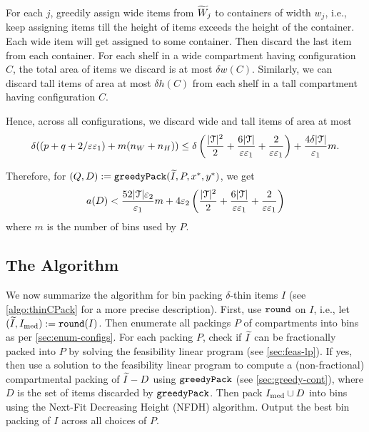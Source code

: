 For each $j$, greedily assign wide items from $\widetilde{W}_j$ to containers of width $w_j$,
i.e., keep assigning items till the height of items exceeds the height of the container.
Each wide item will get assigned to some container.
Then discard the last item from each container.
For each shelf in a wide compartment having configuration $C$,
the total area of items we discard is at most $\delta w(C)$.
Similarly, we can discard tall items of area at most $\delta h(C)$
from each shelf in a tall compartment having configuration $C$.

Hence, across all configurations, we discard wide and tall items of area at most
\[ \delta((p + q + 2/\varepsilon\varepsilon_1) + m(n_W + n_H))
\le \delta\left(\frac{|\mathcal{T}|^2}{2} + \frac{6|\mathcal{T}|}{\varepsilon\varepsilon_1}
    + \frac{2}{\varepsilon\varepsilon_1}\right) + \frac{4\delta|\mathcal{T}|}{\varepsilon_1}m. \]

Therefore, for $(Q, D) := \operatorname{\mathtt{greedyPack}}(\widetilde{I}, P, x^*, y^*)$, we get
\begin{equation}
\label{eqn:greedy-discard-area}
a(D) < \frac{52|\mathcal{T}|\varepsilon_2}{\varepsilon_1} m
    + 4\varepsilon_2\left(\frac{|\mathcal{T}|^2}{2} + \frac{6|\mathcal{T}|}{\varepsilon\varepsilon_1}
        + \frac{2}{\varepsilon\varepsilon_1}\right)
\end{equation}
where $m$ is the number of bins used by $P$.

\subsection{The Algorithm}
\label{sec:thinCPack}

We now summarize the algorithm for bin packing $\delta$-thin items $I$
(see \cref{algo:thinCPack} for a more precise description).
First, use $\operatorname{\mathtt{round}}$ on $I$, i.e., let $(\widetilde{I}, I_{\mathrm{med}}) := \operatorname{\mathtt{round}}(I)$.
Then enumerate all packings $P$ of compartments into bins as per \cref{sec:enum-configs}.
For each packing $P$, check if $\widetilde{I}$ can be fractionally packed into $P$
by solving the feasibility linear program (see \cref{sec:feas-lp}).
If yes, then use a solution to the feasibility linear program to
compute a (non-fractional) compartmental packing of $\widetilde{I} - D$
using $\operatorname{\mathtt{greedyPack}}$ (see \cref{sec:greedy-cont}),
where $D$ is the set of items discarded by $\operatorname{\mathtt{greedyPack}}$.
Then pack $I_{\mathrm{med}} \cup D$ into bins using the Next-Fit Decreasing Height (NFDH) algorithm.
Output the best bin packing of $I$ across all choices of $P$.

